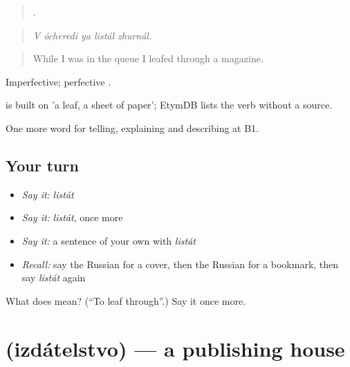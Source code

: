 \begin{quote}
    .
\end{quote}

\begin{quote}
\emph{V ócheredi ya listál zhurnál.}
\end{quote}

\begin{quote}
While I was in the queue I leafed through a magazine.
\end{quote}

Imperfective; perfective .

\begin{cousinweb}
\emph{} is built on \emph{} 'a leaf, a sheet of paper'; EtymDB lists the verb without a source.
\end{cousinweb}

\begin{grammarlens}[title={What you've built}]
One more word for telling, explaining and describing at B1.
\end{grammarlens}

\subsection*{Your turn}
\begin{itemize}
\raggedright
  \item \emph{Say it:} \emph{listát}
  \item \emph{Say it:} \emph{listát}, once more
  \item \emph{Say it:} a sentence of your own with \emph{listát}
  \item \emph{Recall:} say the Russian for a cover, then the Russian for a bookmark, then say \emph{listát} again
\end{itemize}

\begin{tcolorbox}[breakable,colback=teal!4,colframe=teal!35!black,title={Before you move on}]
What does  mean? (\textquotedblleft{}To leaf through\textquotedblright{}.) Say it once more.
\end{tcolorbox}
\section[\texorpdfstring{\ru{издательство} (izdátelstvo)}{издательство (izdátelstvo)}]{ (izdátelstvo) — a publishing house}

\label{lesson:RU-C526-izdatelstvo}




